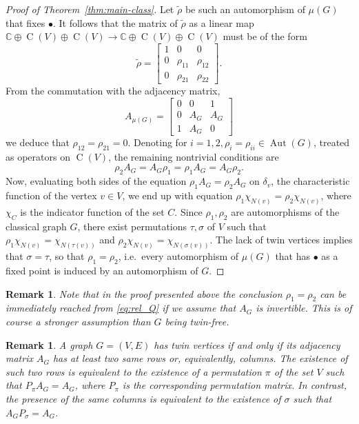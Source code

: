 \documentclass[11pt,reqno]{amsart}
\newtheorem{remark}[proposition]{Remark}
\newcommand{\CC}{\mathbb{C}}
\DeclareMathOperator{\Aut}{Aut}
\DeclareMathOperator{\C}{C}
\begin{document}
\begin{proof}[Proof of Theorem~\ref{thm:main-class}]
Let $\widetilde{\rho}$ be such an automorphism of $\mu(G)$ that fixes $\bullet$. It follows that the matrix of $\widetilde{\rho}$ as a linear map $\CC\oplus\C(V)\oplus\C(V)\to\CC\oplus\C(V)\oplus\C(V)$ must be of the form
\[
\widetilde{\rho}=\begin{bmatrix}
1 & 0 & 0\\
0 &\rho_{11} &\rho_{12}\\
0 &\rho_{21} &\rho_{22}
\end{bmatrix}.
\]
From the commutation with the adjacency matrix,
\[
A_{\scriptscriptstyle\mu(G)}=\begin{bmatrix}
0 & 0 & 1\\
0 & A_{\scriptscriptstyle G} & A_{\scriptscriptstyle G}\\
1& A_{\scriptscriptstyle G} &0
\end{bmatrix}
\]
we deduce that $\rho_{12}=\rho_{21}=0$. Denoting for $i=1,2$$,\rho_{i}=\rho_{ii}\in\Aut(G)$, treated as operators on $\C(V)$, the remaining nontrivial conditions are
\begin{equation}\label{eq:rel_Q}
\rho_{2}A_{\scriptscriptstyle G}=A_{\scriptscriptstyle G}\rho_{1}=\rho_{1}A_{\scriptscriptstyle G}=A_{\scriptscriptstyle G}\rho_{2}.
\end{equation}
Now, evaluating both sides of the equation $\rho_1 A_{\scriptscriptstyle G}=\rho_2 A_{\scriptscriptstyle G}$ on $\delta_v$, the characteristic function of the vertex $v\in V$, we end up with equation $\rho_1\chi_{N(v)}=\rho_2\chi_{N(v)}$, where $\chi_{C}$ is the indicator function of the set $C$. Since $\rho_1,\rho_2$ are automorphisms of the classical graph $G$, there exist permutations $\tau,\sigma$ of $V$ such that $\rho_1\chi_{N(v)}=\chi_{N(\tau(v))}$ and $\rho_2\chi_{N(v)}=\chi_{N(\sigma(v))}$. The lack of twin vertices implies that $\sigma=\tau$, so that $\rho_1=\rho_2$, i.e.~every automorphism of $\mu(G)$ that has $\bullet$ as a fixed point is induced by an automorphism of $G$.
\end{proof}

\begin{remark}\label{rem:detAzero}
Note that in the proof presented above the conclusion $\rho_1=\rho_2$ can be immediately reached from \eqref{eq:rel_Q} if we assume that $A_{\scriptscriptstyle G}$ is invertible. This is of course a stronger assumption than $G$ being twin-free.
\end{remark}

\begin{remark}
A graph $G=(V,E)$ has twin vertices if and only if its adjacency matrix $A_{\scriptscriptstyle G}$ has at least two same rows or, equivalently, columns. The existence of such two rows is equivalent to the existence of a permutation $\pi$ of the set $V$ such that $P_\pi A_{\scriptscriptstyle G}=A_{\scriptscriptstyle G}$, where $P_\pi$ is the corresponding permutation matrix. In contrast, the presence of the same columns is equivalent to the existence of $\sigma$ such that $A_{\scriptscriptstyle G} P_\sigma =A_{\scriptscriptstyle G}$.
\end{remark}
\end{document}
